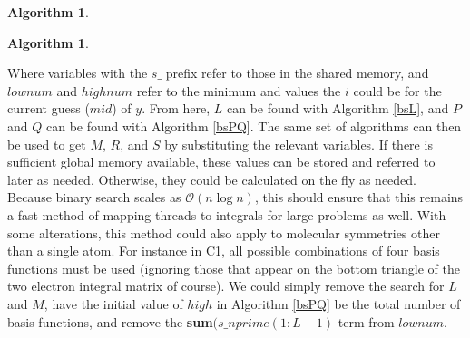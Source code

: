 \documentclass[12pt]{report}
\newtheorem{algorithm}[theorem]{Algorithm}
\begin{document}
\begin{algorithm}
\caption{Binary Search for $L$}
\label{bsL}
\begin{algorithmic}

		\ENDIF
	\ENDWHILE
\ENDIF

\end{algorithmic}
\end{algorithm}

\begin{algorithm}
\caption{Binary Search for $P$ and $Q$}
\label{bsPQ}
\begin{algorithmic}

		\ENDIF
	\ENDWHILE
\ENDIF

\end{algorithmic}
\end{algorithm}

Where variables with the $s\_$ prefix refer to those in the shared memory, and $lownum$ and $highnum$ refer to the minimum and values the $i$ could be for the current guess ($mid$) of $y$. From here, $L$ can be found with Algorithm \ref{bsL}, and $P$ and $Q$ can be found with Algorithm \ref{bsPQ}. The same set of algorithms can then be used to get $M$, $R$, and $S$ by substituting the relevant variables. If there is sufficient global memory available, these values can be stored and referred to later as needed. Otherwise, they could be calculated on the fly as needed. Because binary search scales as $\mathcal{O}(n\log{}n)$, this should ensure that this remains a fast method of mapping threads to integrals for large problems as well. With some alterations, this method could also apply to molecular symmetries other than a single atom. For instance in C1, all possible combinations of four basis functions must be used (ignoring those that appear on the bottom triangle of the two electron integral matrix of course). We could simply remove the search for $L$ and $M$, have the initial value of $high$ in Algorithm \ref{bsPQ} be the total number of basis functions, and remove the \textbf{sum}$(s\_nprime(1:L-1)$ term from $lownum$. 
\end{document}
